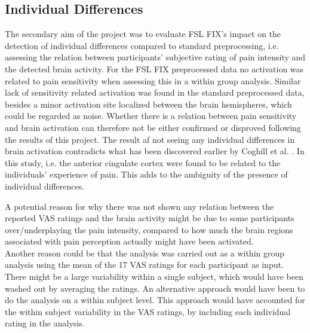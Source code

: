 \subsection*{Individual Differences}
The secondary aim of the project was to evaluate FSL FIX’s impact on the detection of individual differences compared to standard preprocessing, i.e. assessing the relation between participants’ subjective rating of pain intensity and the detected brain activity.
For the FSL FIX preprocessed data no activation was related to pain sensitivity when assessing this in a within group analysis. Similar lack of sensitivity related activation was found in the standard preprocessed data, besides a minor activation site localized between the brain hemispheres, which could be regarded as noise. Whether there is a relation between pain sensitivity and brain activation can therefore not be either confirmed or disproved following the results of this project. The result af not seeing any individual differences in brain activation contradicts what has been discovered earlier by Coghill et al. \cite{Coghill2003}. In this study, i.e. the anterior cingulate cortex were found to be related to the individuals' experience of pain. This adds to the ambiguity of the presence of individual differences.    

A potential reason for why there was not shown any relation between the reported VAS ratings and the brain activity might be due to some participants over/underplaying the pain intensity, compared to how much the brain regions associated with pain perception actually might have been activated. \\
Another reason could be that the analysis was carried out as a within group analysis using the mean of the 17 VAS ratings for each participant as input. There might be a large variability within a single subject, which would have been washed out by averaging the ratings. An alternative approach would have been to do the analysis on a within subject level. This approach would have accounted for the within subject variability in the VAS ratings, by including each individual rating in the analysis. 

